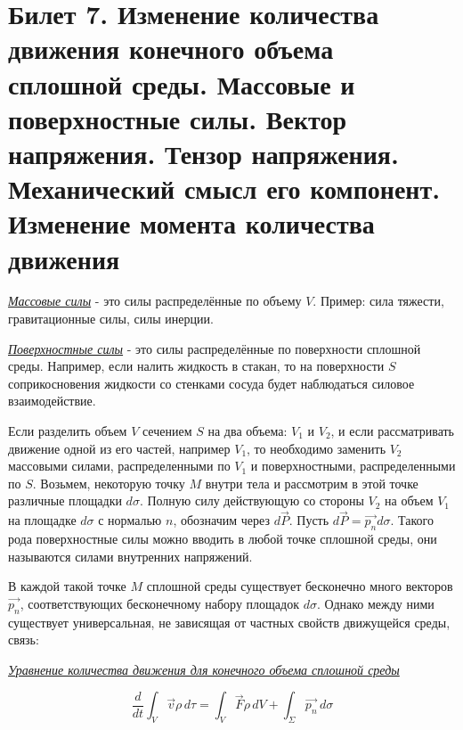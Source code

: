 \newpage
\section{Билет 7. Изменение количества движения конечного объема сплошной среды. Массовые и поверхностные силы. Вектор напряжения. Тензор напряжения. Механический смысл его компонент. Изменение момента количества движения}

\textit{\underline{Массовые силы}} - это силы распределённые по объему $V$. Пример: сила тяжести, гравитационные силы, силы инерции.

\textit{\underline{Поверхностные силы}} - это силы распределённые по поверхности сплошной среды. Например, если налить жидкость в стакан, то на поверхности $S$ соприкосновения жидкости со стенками сосуда будет наблюдаться силовое взаимодействие.

Если разделить объем $V$ сечением $S$ на два объема: $V_1$ и $V_2$, и если рассматривать движение одной из его частей, например $V_1$, то необходимо заменить $V_2$ массовыми силами, распределенными по $V_1$ и поверхностными, распределенными по $S$. Возьмем, некоторую точку $M$ внутри тела и рассмотрим в этой точке различные площадки $d\sigma$. Полную силу действующую со стороны $V_2$ на объем $V_1$ на площадке $d\sigma$ с нормалью $n$, обозначим через $d\vec{P}$. Пусть $d\vec{P} = \vec{p_n}d\sigma$. Такого рода поверхностные силы можно вводить в любой точке сплошной среды, они называются силами внутренних напряжений. 

В каждой такой точке $M$ сплошной среды существует бесконечно много векторов $\vec{p_n}$, соответствующих бесконечному набору площадок $d\sigma$. Однако между ними существует универсальная, не зависящая от частных свойств движущейся среды, связь:

\begin{center}
    \textit{\underline{Уравнение количества движения для конечного объема сплошной среды}}
\end{center}
$$
\frac{d}{dt}  \int_{V} \vec{v} \rho \,d\tau =  \int_{V} \vec{F} \rho \,dV  + \int_{\Sigma} \vec{p_n} \,d\sigma
$$

